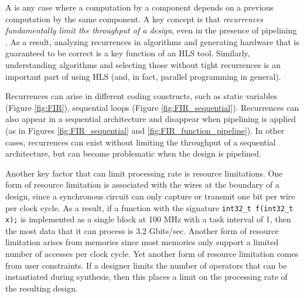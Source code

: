 
A  is any case where a computation by a component depends on a previous computation by the same component.  A key concept is that {\em recurrences fundamentally limit the throughput of a design}, even in the presence of pipelining \cite{papaefthymiou91,leiserson93}.  As a result, analyzing recurrences in algorithms and generating hardware that is guaranteed to be correct is a key function of an HLS tool.  Similarly, understanding algorithms and selecting those without tight recurrences is an important part of using HLS (and, in fact, parallel programming in general).

Recurrences can arise in different coding constructs, such as static variables (Figure \ref{fig:FIR}), sequential loops (Figure \ref{fig:FIR_sequential}).  Recurrences can also appear in a sequential architecture and disappear when pipelining is applied (as in Figures \ref{fig:FIR_sequential} and \ref{fig:FIR_function_pipeline}).  In other cases, recurrences can exist without limiting the throughput of a sequential architecture, but can become problematic when the design is pipelined.


%


Another key factor that can limit processing rate is resource limitations.  One form of resource limitation is associated with the wires at the boundary of a design, since a synchronous circuit can only capture or transmit one bit per wire per clock cycle.  As a result, if a function with the signature \lstinline|int32_t f(int32_t x);| is implemented as a single block at 100 MHz with a task interval of 1, then the most data that it can process is 3.2 Gbits/sec. Another form of resource limitation arises from memories since most memories only support a limited number of accesses per clock cycle.  Yet another form of resource limitation comes from user constraints.  If a designer limits the number of operators that can be instantiated during synthesis, then this places a limit on the processing rate of the resulting design.

